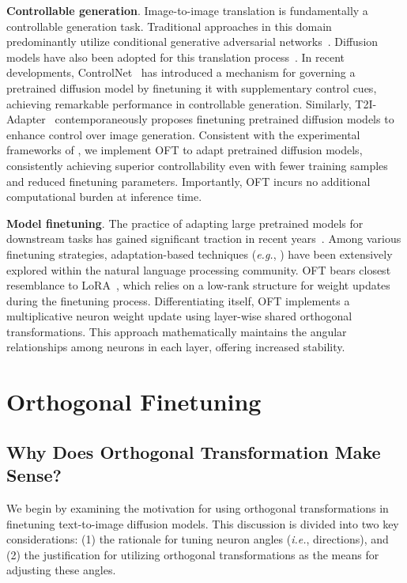 \textbf{Controllable generation}. Image-to-image translation is fundamentally a controllable generation task. Traditional approaches in this domain predominantly utilize conditional generative adversarial networks~\cite{isola2017image,zhu2017toward,wang2018high,park2019semantic,choi2018stargan}. Diffusion models have also been adopted for this translation process~\cite{saharia2022palette,voynov2022sketch,wang2022pretraining}. In recent developments, ControlNet~\cite{zhang2023adding} has introduced a mechanism for governing a pretrained diffusion model by finetuning it with supplementary control cues, achieving remarkable performance in controllable generation. Similarly, T2I-Adapter~\cite{mou2023t2i} contemporaneously proposes finetuning pretrained diffusion models to enhance control over image generation. Consistent with the experimental frameworks of \cite{zhang2023adding,mou2023t2i}, we implement OFT to adapt pretrained diffusion models, consistently achieving superior controllability even with fewer training samples and reduced finetuning parameters. Importantly, OFT incurs no additional computational burden at inference time.

\textbf{Model finetuning}. The practice of adapting large pretrained models for downstream tasks has gained significant traction in recent years~\cite{devlin2018bert,brown2020language,he2022masked}. Among various finetuning strategies, adaptation-based techniques (\emph{e.g.}, \cite{hulora2022,houlsby2019parameter,pfeiffer2020adapterfusion}) have been extensively explored within the natural language processing community. OFT bears closest resemblance to LoRA~\cite{hulora2022}, which relies on a low-rank structure for weight updates during the finetuning process. Differentiating itself, OFT implements a multiplicative neuron weight update using layer-wise shared orthogonal transformations. This approach mathematically maintains the angular relationships among neurons in each layer, offering increased stability.

\section{Orthogonal Finetuning}

\subsection{Why Does Orthogonal Transformation Make Sense?}

We begin by examining the motivation for using orthogonal transformations in finetuning text-to-image diffusion models. This discussion is divided into two key considerations: (1) the rationale for tuning neuron angles (\emph{i.e.}, directions), and (2) the justification for utilizing orthogonal transformations as the means for adjusting these angles.

